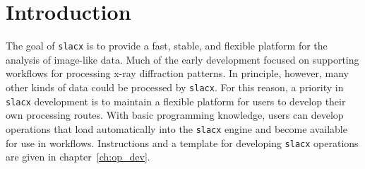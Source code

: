 \section{Introduction}

The goal of \verb|slacx| is to provide a fast, stable, and flexible platform
for the analysis of image-like data. 
Much of the early development focused on supporting workflows 
for processing x-ray diffraction patterns. 
In principle, however, many other kinds of data could be processed by \verb|slacx|.
For this reason, a priority in \verb|slacx| development is to maintain a flexible platform
for users to develop their own processing routes.
With basic programming knowledge, 
users can develop operations 
that load automatically into the \verb|slacx| engine
and become available for use in workflows.
Instructions and a template for developing \verb|slacx| operations
are given in chapter~\ref{ch:op_dev}.

 




